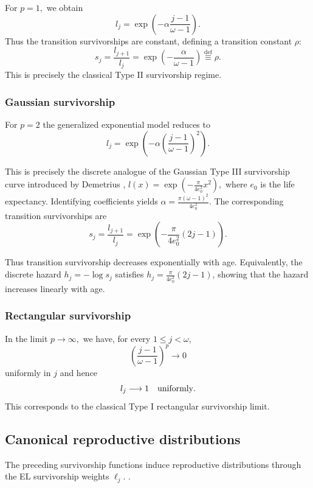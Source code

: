 \documentclass[10pt,a4paper]{amsart}
\theoremstyle{definition}
\theoremstyle{remark}
\numberwithin{equation}{section}
\begin{document}
For
$
p=1,
$
we obtain
\begin{equation}
\label{eq_l_j}
l_j
=
\exp\left(
-\alpha
\frac{j-1}{\omega-1}
\right).
\end{equation}
Thus the transition survivorships are constant, defining a transition constant $\rho$:
\begin{equation}
\label{eq_geometric_TypeII}
s_j
=
\frac{l_{j+1}}{l_j}
=
\exp\left(
-\frac{\alpha}{\omega-1}
\right)
\stackrel{\text{def}}{\equiv} \rho.
\end{equation}
This is precisely the classical Type II survivorship regime.

\subsubsection{Gaussian survivorship}

For
$
p=2
$
the generalized exponential model reduces to
\[
l_j
=
\exp\left(
-\alpha
\left(
\frac{j-1}{\omega-1}
\right)^2
\right).
\]

This is precisely the discrete analogue of the Gaussian Type III
survivorship curve introduced by Demetrius \cite{Demetrius78}, $
l(x)
=
\exp\left(
-\frac{\pi}{4e_0^2}x^2
\right),$ where $e_0$ is the life expectancy.
Identifying coefficients yields
$
\alpha
=
\frac{\pi(\omega-1)^2}{4e_0^2}$.
The corresponding transition survivorships are
\[
s_j
=
\frac{l_{j+1}}{l_j}
=
\exp\left(
-\frac{\pi}{4e_0^2}
(2j-1)
\right).
\]

Thus transition survivorship decreases exponentially with age.
Equivalently, the discrete hazard
$
h_j=-\log s_j
$
satisfies
$
h_j
=
\frac{\pi}{4e_0^2}
(2j-1)$, 
showing that the hazard increases linearly with age.

\subsubsection{Rectangular survivorship}
\label{subsub_rectangular}
In the limit
$
p\to\infty,
$
we have, for every \(1\le j<\omega\),
\[
\left(
\frac{j-1}{\omega-1}
\right)^p
\longrightarrow 0 
\]
uniformly in $j$ and hence
\[
l_j\longrightarrow 1 \quad {\rm uniformly}.
\]
This corresponds to the classical  Type I rectangular survivorship limit.


\subsection{Canonical reproductive distributions}
\label{sub_canonical}
The preceding survivorship functions induce reproductive
distributions through the EL survivorship weights
\(\ell_j\). .
\end{document}
